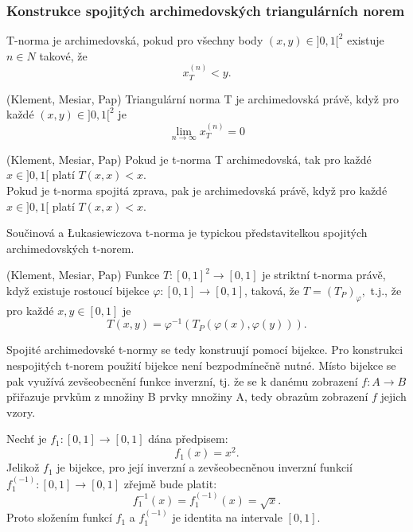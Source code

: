 \subsubsection{Konstrukce spojitých archimedovských triangulárních norem}
\begin{definition}
    T-norma je archimedovská, pokud pro všechny body $(x,y) \in ]0,1[^2$ existuje $n \in N$ takové, že $$x_T^{(n)} < y.$$
\end{definition}
\begin{sentence} (Klement, Mesiar, Pap)
    Triangulární norma T je archimedovská právě, když pro každé $(x,y) \in ]0,1[^2$ je $$\lim_{n \to \infty}x_T^{(n)} = 0$$
\end{sentence}
\begin{sentence} (Klement, Mesiar, Pap)
    Pokud je t-norma T archimedovská, tak pro každé $x \in ]0,1[$ platí $T(x,x) < x.$\\
    Pokud je t-norma spojitá zprava, pak je archimedovská právě, když pro každé $x \in ]0,1[$ platí $T(x,x) < x.$
\end{sentence}

    Součinová a Łukasiewiczova t-norma je typickou představitelkou spojitých archimedovských t-norem.
\begin{sentence} (Klement, Mesiar, Pap)
    Funkce $ T:[0,1]^2 \rightarrow [0,1]$ je
    striktní t-norma právě, když existuje
    rostoucí bijekce $\varphi:[0,1] \rightarrow [0,1]$, taková, že
    $T=(T_P)_\varphi,$ t.j., že
    pro každé $x,y \in [0,1]$ je
    $$T(x,y)=\varphi^{-1}(T_P(\varphi(x),\varphi(y))).$$
\end{sentence}

Spojité archimedovské t-normy se tedy konstruují pomocí bijekce. Pro konstrukci nespojitých t-norem použití bijekce není bezpodmínečně nutné. Místo bijekce se pak využívá zevšeobecnění funkce inverzní, tj. že se k danému zobrazení $f: A \rightarrow B$ přiřazuje prvk\r um z množiny B prvky množiny A, tedy obraz\r um zobrazení $f$ jejich vzory.
\begin{example}
    Nech\v t je  $f_1:[0,1] \rightarrow [0,1]$  dána předpisem:
    $$f_1(x)=x^2.$$
    Jelikož $f_1$ je bijekce, pro její inverzní a zevšeobecněnou inverzní funkcií
    \newline$f_1^{(-1)}:[0,1] \rightarrow [0,1]$ zřejmě bude platit:
    $$f_1^{-1}(x)=f_1^{(-1)}(x)= \sqrt{x}.$$
    Proto složením funkcí $f_1$ a $f_1^{(-1)}$ je
    identita na intervale $[0,1].$
\end{example}

